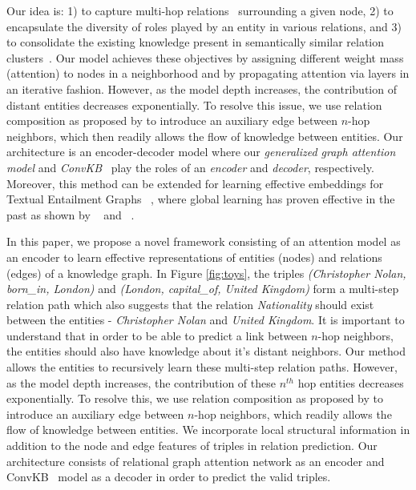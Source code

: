 \documentclass[11pt,a4paper]{article}
\begin{document}
Our idea is: 1) to capture multi-hop relations~\cite{Lin2015} surrounding a given node, 2) to encapsulate the diversity of roles played by an entity in various relations, and 3) to consolidate the existing knowledge present in semantically similar relation clusters~\cite{Valverde_2012}. 
Our model achieves these objectives by assigning different weight mass (attention) to nodes in a neighborhood and by propagating attention via layers in an iterative fashion. However, as the model depth increases, the contribution of distant entities decreases exponentially. To resolve this issue, we use relation composition as proposed by \cite{Lin2015} to introduce an auxiliary edge between $n$-hop neighbors, which then readily allows the flow of knowledge between entities. 
Our architecture is an encoder-decoder model where our \emph{generalized graph attention model} and \emph{ConvKB}~\cite{nguyen2018novel} play the roles of an \emph{encoder} and \emph{decoder}, respectively. Moreover, this method can be extended for learning effective embeddings for Textual Entailment Graphs ~\cite{kotlerman_dagan_magnini_bentivogli_2015}, where global learning has proven effective in the past as shown by ~\cite{berant-etal-2015-efficient} and ~\cite{berant-etal-2010-global}.



In this paper, we propose a novel framework consisting of an attention model as an encoder to learn effective representations of entities (nodes) and relations (edges) of a knowledge graph. In Figure \ref{fig:toys}, the triples \textit{(Christopher Nolan, born\_in, London)} and \textit{(London, capital\_of, United Kingdom)} form a multi-step relation path which also suggests that the relation \textit{Nationality} should exist between the entities - \textit{Christopher Nolan} and \textit{United Kingdom}. It is important to understand that in order to be able to predict a link between $n$-hop neighbors, the entities should also have knowledge about it’s distant neighbors. Our method allows the entities to recursively learn these multi-step relation paths. However, as the model depth increases, the contribution of these $n^{th}$ hop entities decreases exponentially. To resolve this, we use relation composition as proposed by \cite{Lin2015} to introduce an auxiliary edge between $n$-hop neighbors, which readily allows the flow of knowledge between entities. We incorporate local structural information in addition to the node and edge features of triples in relation prediction. Our architecture consists of relational graph attention network as an encoder and ConvKB~\cite{nguyen2018novel} model as a decoder in order to predict the valid triples.
\fi
\end{document}
